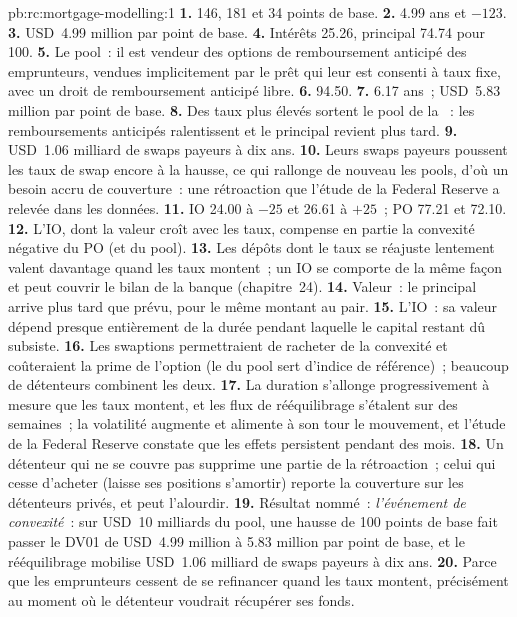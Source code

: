 \begin{solution}{pb:rc:mortgage-modelling:1}
\textbf{1.} 146, 181 et 34 points de base.
\textbf{2.} 4.99 ans et $-123$.
\textbf{3.} USD~4.99 million par point de base.
\textbf{4.} Intérêts 25.26, principal 74.74 pour 100.
\textbf{5.} Le pool~: il est vendeur des options de remboursement anticipé des emprunteurs, vendues implicitement par
le prêt qui leur est consenti à taux fixe, avec un droit de remboursement anticipé libre.
\textbf{6.} 94.50.
\textbf{7.} 6.17 ans~; USD~5.83 million par point de base.
\textbf{8.} Des taux plus élevés sortent le pool de la ~: les remboursements anticipés ralentissent et
le principal revient plus tard.
\textbf{9.} USD~1.06 milliard de swaps payeurs à dix ans.
\textbf{10.} Leurs swaps payeurs poussent les taux de swap encore à la hausse, ce qui rallonge de nouveau les pools,
d'où un besoin accru de couverture~: une rétroaction que l'étude de la Federal Reserve a relevée dans les données.
\textbf{11.} IO 24.00 à $-25$ et 26.61 à $+25$~; PO 77.21 et 72.10.
\textbf{12.} L'IO, dont la valeur croît avec les taux, compense en partie la convexité négative du PO
(et du pool).
\textbf{13.} Les dépôts dont le taux se réajuste lentement valent davantage quand les taux montent~; un IO se comporte de la
même façon et peut couvrir le bilan de la banque (chapitre~24).
\textbf{14.} Valeur~: le principal arrive plus tard que prévu, pour le même montant au pair.
\textbf{15.} L'IO~: sa valeur dépend presque entièrement de la durée pendant laquelle le capital restant dû subsiste.
\textbf{16.} Les swaptions permettraient de racheter de la convexité et coûteraient la prime de l'option (le  du pool sert d'indice de référence)~; beaucoup de détenteurs combinent les deux.
\textbf{17.} La duration s'allonge progressivement à mesure que les taux montent, et les flux de rééquilibrage s'étalent sur des semaines~;
la volatilité augmente et alimente à son tour le mouvement, et l'étude de la Federal Reserve constate que les effets persistent pendant des mois.
\textbf{18.} Un détenteur qui ne se couvre pas supprime une partie de la rétroaction~; celui qui cesse
d'acheter (laisse ses positions s'amortir) reporte la couverture sur les détenteurs privés, et peut l'alourdir.
\textbf{19.} Résultat nommé~: \emph{l'événement de convexité}~: sur USD~10 milliards du pool, une hausse de 100 points de base
fait passer le DV01 de USD~4.99 million à 5.83 million par point de base, et le rééquilibrage mobilise
USD~1.06 milliard de swaps payeurs à dix ans.
\textbf{20.} Parce que les emprunteurs cessent de se refinancer quand les taux montent, précisément au moment où le détenteur
voudrait récupérer ses fonds.
\end{solution}

